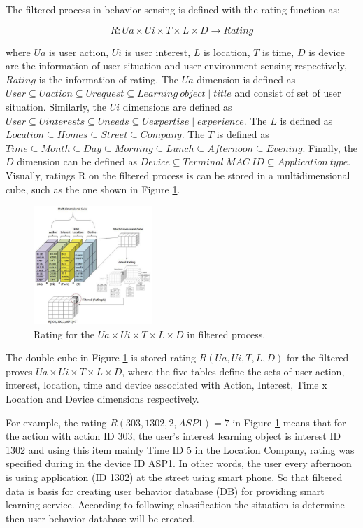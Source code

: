 \documentclass[journal]{vgtc}
\begin{document}
  The filtered process in behavior sensing is defined with the rating function as:

  \begin{equation}
    R: Ua \times Ui \times T \times L \times D \rightarrow Rating
  \end{equation}

  where $Ua$ is user action, $Ui$ is user interest, $L$ is location, $T$ is time, $D$ is device are the information of user situation  and user environment sensing respectively, $Rating$ is the  information of rating. The $Ua$ dimension is defined as $User \subseteq Uaction \subseteq Urequest \subseteq Learning\ object \mid title$ and consist of set of user situation. Similarly, the $Ui$ dimensions are defined as $User \subseteq U interests \subseteq U needs \subseteq U expertise \mid experience$. The $L$ is defined as $Location \subseteq Homes \subseteq Street \subseteq Company$. The $T$ is defined as $Time \subseteq Month \subseteq Day \subseteq Morning \subseteq Lunch \subseteq Afternoon \subseteq Evening$. Finally, the $D$ dimension can be defined as $Device \subseteq Terminal\ MAC\ ID \subseteq Application\ type$. Visually, ratings R on the filtered process is can be stored in a multidimensional cube, such as the one shown in Figure \ref{rating}.

  \begin{figure}[!b]
    \centering
    \includegraphics[width=0.4\textwidth]{rating}
    \caption{Rating for the $Ua \times Ui \times T \times L \times D$ in filtered process\cite{Kim2013}.}
    \label{rating}
  \end{figure}

  The double cube in Figure \ref{rating} is stored rating $R(Ua, Ui, T, L, D)$ for the filtered proves $Ua \times Ui \times T \times L \times D$, where the five tables define the sets of user action, interest, location, time and device associated with Action, Interest, Time x Location and Device dimensions respectively.

  For example, the rating $R(303,1302,2,ASP1)=7$ in Figure \ref{rating} means that for the action with action ID 303, the user's interest learning object is interest ID 1302 and using this item mainly Time ID 5 in the Location Company, rating was specified during in the device ID ASP1. In other words, the user every afternoon is using application (ID 1302) at the street using smart phone. So that filtered data is basis for creating user behavior database (DB) for providing smart learning service. According to following classification the situation is determine then user behavior database will be created.
\end{document}
